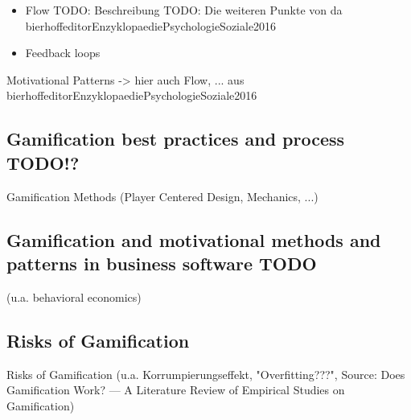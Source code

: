 \begin{itemize}
	\item Flow \newline
	TODO: Beschreibung \cite[p. 19, 20, 21]{bierhoffeditorEnzyklopaediePsychologieSoziale2016}
	TODO: Die weiteren Punkte von da bierhoffeditorEnzyklopaediePsychologieSoziale2016
	\item Feedback loops
\end{itemize}

Motivational Patterns
-> hier auch Flow, ... aus bierhoffeditorEnzyklopaediePsychologieSoziale2016

\subsection{Gamification best practices and process TODO!?}
\label{sec:theoryBd}
Gamification Methods (Player Centered Design, Mechanics, ...)

\subsection{Gamification and motivational methods and patterns in business software TODO}
\label{sec:theoryBe}
(u.a. behavioral economics)

\subsection{Risks of Gamification}
\label{sec:theoryBf}
Risks of Gamification (u.a. Korrumpierungseffekt, "Overfitting???", Source: Does Gamification Work? — A Literature Review of Empirical Studies on
Gamification)


\newpage
